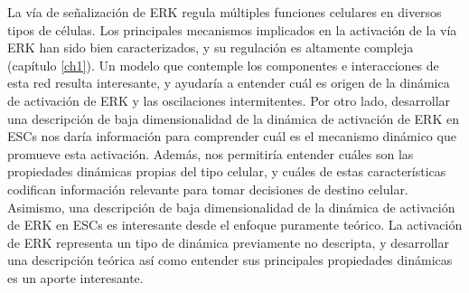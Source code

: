 \documentclass[./main.tex]{subfiles}
\begin{document}
La vía de señalización de ERK regula múltiples funciones celulares en diversos tipos de células. Los principales mecanismos implicados en la activación de la vía ERK han sido bien caracterizados, y su regulación es altamente compleja (capítulo \ref{ch1}). Un modelo que contemple los componentes e interacciones de esta red resulta interesante, y ayudaría a entender cuál es origen de la dinámica de activación de ERK y las oscilaciones intermitentes. Por otro lado, desarrollar una descripción de baja dimensionalidad de la dinámica de activación de ERK en ESCs nos daría información para comprender cuál es el mecanismo dinámico que promueve esta activación. Además, nos permitiría entender cuáles son las propiedades dinámicas propias del tipo celular, y cuáles de estas características codifican información relevante para tomar decisiones de destino celular. Asimismo, una descripción de baja dimensionalidad de la dinámica de activación de ERK en ESCs es interesante desde el enfoque puramente teórico. La activación de ERK representa un tipo de dinámica previamente no descripta, y desarrollar una descripción teórica así como entender sus principales propiedades dinámicas es un aporte interesante. 
\end{document}
